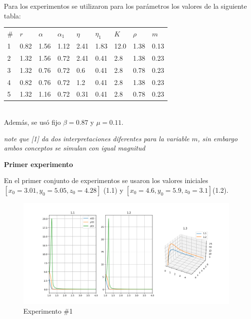 \documentclass{wscpaperproc}
\theoremstyle{wsc}
\begin{document}
Para los experimentos se utilizaron para los parámetros los valores de la siguiente tabla:

\begin{tabular}{p{1cm} | p{1cm} | p{1cm} | p{1cm} | p{1cm} | p{1cm} | p{1cm} | p{1cm} | p{1cm} }
	$\#$ & $r$  & $\alpha$ & $\alpha_1$ & $\eta$ & $\eta_1$ & $K$  & $\rho$ & $m$  \\
	1    & 0.82 & 1.56     & 1.12       & 2.41   & 1.83     & 12.0 & 1.38   & 0.13 \\
	2    & 1.32 & 1.56     & 0.72       & 2.41   & 0.41     & 2.8  & 1.38   & 0.23 \\
	3    & 1.32 & 0.76     & 0.72       & 0.6    & 0.41     & 2.8  & 0.78   & 0.23 \\
	4    & 0.82 & 0.76     & 0.72       & 1.2    & 0.41     & 2.8  & 1.38   & 0.23 \\
	5    & 1.32 & 1.16     & 0.72       & 0.31   & 0.41     & 2.8  & 0.78   & 0.23 \\
\end{tabular}
\\

Además, se usó fijo $\beta=0.87$ y $\mu=0.11$.

	{\it note que [1] da dos interpretaciones diferentes para la variable $m$, sin embargo ambos conceptos se simulan con igual magnitud}

\vspace*{0.5cm}
{\bf Primer experimento}

En el primer conjunto de experimentos se usaron los valores iniciales $[x_0=3.01, y_0=5.05, z_0=4.28]$ (1.1)
y $[x_0=4.6, y_0=5.9, z_0=3.1]$(1.2).

\begin{figure}[h!]
	\includegraphics[width=\linewidth]{../numerical_models/images/1.png}
	\caption{Experimento \#1}
\end{figure}
\end{document}
